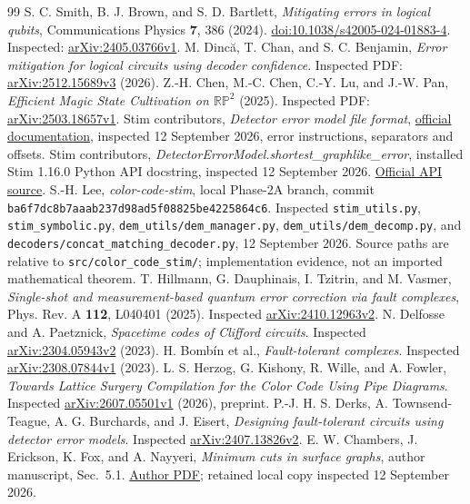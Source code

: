 \documentclass[11pt]{article}
\theoremstyle{definition}
\theoremstyle{plain}
\theoremstyle{remark}
\begin{document}
\begin{thebibliography}{99}
S. C. Smith, B. J. Brown, and S. D. Bartlett,
\emph{Mitigating errors in logical qubits}, Communications Physics
\textbf{7}, 386 (2024).
\href{https://doi.org/10.1038/s42005-024-01883-4}{doi:10.1038/s42005-024-01883-4}.
Inspected: \href{https://arxiv.org/abs/2405.03766v1}{arXiv:2405.03766v1}.
M. Dinc\u{a}, T. Chan, and S. C. Benjamin,
\emph{Error mitigation for logical circuits using decoder confidence}.
Inspected PDF: \href{https://arxiv.org/abs/2512.15689v3}{arXiv:2512.15689v3} (2026).
Z.-H. Chen, M.-C. Chen, C.-Y. Lu, and J.-W. Pan,
\emph{Efficient Magic State Cultivation on $\mathbb{RP}^2$} (2025).
Inspected PDF: \href{https://arxiv.org/abs/2503.18657v1}{arXiv:2503.18657v1}.
Stim contributors, \emph{Detector error model file format},
\href{https://github.com/quantumlib/Stim/blob/main/doc/file_format_dem_detector_error_model.md}{official documentation},
inspected 12 September 2026, error instructions, separators and offsets.
Stim contributors, \emph{DetectorErrorModel.shortest\_graphlike\_error},
installed Stim 1.16.0 Python API docstring, inspected 12 September 2026.
\href{https://github.com/quantumlib/Stim/blob/main/src/stim/dem/detector_error_model.pybind.cc}{Official API source}.
S.-H. Lee, \emph{color-code-stim}, local Phase-2A branch,
commit \texttt{ba6f7dc8b7aaab237d98ad5f08825be4225864c6}.
Inspected \texttt{stim\_utils.py}, \texttt{stim\_symbolic.py},
\texttt{dem\_utils/dem\_manager.py}, \texttt{dem\_utils/dem\_decomp.py},
and \texttt{decoders/concat\_matching\_decoder.py}, 12 September 2026.
Source paths are relative to \texttt{src/color\_code\_stim/};
implementation evidence, not an imported mathematical theorem.
T. Hillmann, G. Dauphinais, I. Tzitrin, and M. Vasmer,
\emph{Single-shot and measurement-based quantum error correction via fault complexes},
Phys. Rev. A \textbf{112}, L040401 (2025).
Inspected \href{https://arxiv.org/abs/2410.12963v2}{arXiv:2410.12963v2}.
N. Delfosse and A. Paetznick, \emph{Spacetime codes of Clifford circuits}.
Inspected \href{https://arxiv.org/abs/2304.05943v2}{arXiv:2304.05943v2} (2023).
H. Bomb\'in et al., \emph{Fault-tolerant complexes}.
Inspected \href{https://arxiv.org/abs/2308.07844v1}{arXiv:2308.07844v1} (2023).
L. S. Herzog, G. Kishony, R. Wille, and A. Fowler,
\emph{Towards Lattice Surgery Compilation for the Color Code Using Pipe Diagrams}.
Inspected \href{https://arxiv.org/abs/2607.05501v1}{arXiv:2607.05501v1} (2026), preprint.
P.-J. H. S. Derks, A. Townsend-Teague, A. G. Burchards, and J. Eisert,
\emph{Designing fault-tolerant circuits using detector error models}.
Inspected \href{https://arxiv.org/abs/2407.13826v2}{arXiv:2407.13826v2}.
E. W. Chambers, J. Erickson, K. Fox, and A. Nayyeri,
\emph{Minimum cuts in surface graphs}, author manuscript, Sec.~5.1.
\href{https://ekfox.web.illinois.edu/publications/min-cut-surfaces/min-cut-surfaces.pdf}{Author PDF};
retained local copy inspected 12 September 2026.
\end{thebibliography}
\end{document}
